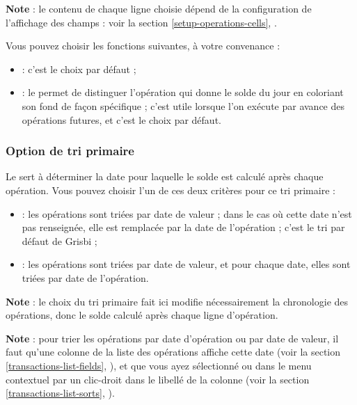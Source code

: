\textbf{Note} : le contenu de chaque ligne choisie dépend de la configuration de l'affichage des champs : voir la section \vref{setup-operations-cells}, .

Vous pouvez choisir les fonctions suivantes, à votre convenance :
\begin{itemize}
	\item {} : c'est le choix par défaut ;
	\item {} : le  permet de distinguer l'opération qui donne le solde du jour en coloriant son fond de façon spécifique ; c'est utile lorsque l'on exécute par avance des opérations futures, et c'est le choix par défaut.
\end{itemize}


\subsubsection{Option de tri primaire}

Le  sert à déterminer la date pour laquelle le  solde est calculé après chaque opération. Vous pouvez choisir l'un de ces deux critères pour ce tri primaire :

\begin{itemize}
	\item {} : les opérations sont triées par date de valeur ; dans le cas où cette date n'est pas renseignée, elle est remplacée par la date de l'opération ; c'est le \gls{tri} par défaut de Grisbi ;
	\item {} : les opérations sont triées par date de valeur, et pour chaque date, elles sont triées par date de l'opération.
\end{itemize}

\textbf{Note} : le choix du \gls{tri primaire} fait ici modifie nécessairement la chronologie des opérations, donc le solde calculé après chaque ligne d'opération.

\textbf{Note} : pour trier les opérations par date d'opération ou par date de valeur, il faut qu'une colonne de la liste des opérations affiche cette date (voir la section \vref{transactions-list-fields}, ), et que vous ayez sélectionné  ou  dans le menu contextuel par un clic-droit dans le libellé de la colonne (voir la section \vref{transactions-list-sorts}, ).


